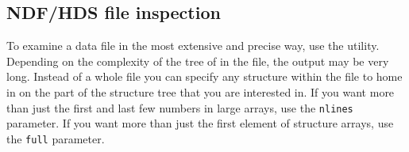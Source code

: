 \subsection{\label{trace2}NDF/HDS file inspection}

   To examine a data file in the most extensive and precise way, use the
{\tt {}}
   utility. Depending on the complexity of the tree of
   in the file, the output may be very long. Instead of a whole file you
   can specify any structure within the file to home in on the part of
   the structure tree that you are interested in.
   If you want more than just the first and
   last few numbers in large arrays, use the {\tt nlines} parameter.
   If you want more than just the first element of structure arrays, use
   the {\tt full} parameter.

